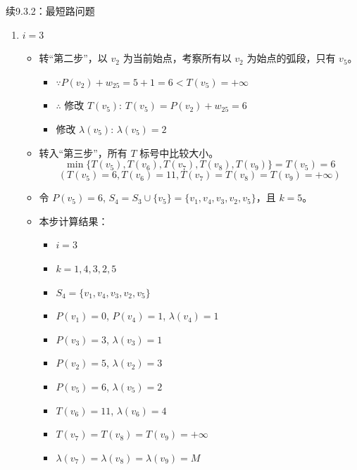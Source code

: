 \begin{exbox}{续9.3.2：最短路问题}{}
\begin{enumerate}[label=(\arabic*)]
			\item \( i = 3 \)
			\begin{itemize}
				\item 转“第二步”，以 \( v_2 \) 为当前始点，考察所有以 \( v_2 \) 为始点的弧段，只有 \( v_5 \)。
				\begin{itemize}
					\item \(\because P(v_2) + w_{25} = 5 + 1 = 6 < T(v_5) = +\infty \)
					\item \(\therefore\) 修改 \( T(v_5) \): \( T(v_5) = P(v_2) + w_{25} = 6 \)
					\item 修改 \( \lambda(v_5) \): \( \lambda(v_5) = 2 \)
				\end{itemize}
				\item 转入“第三步”，所有 \( T \) 标号中比较大小。
				\[
				\min\{T(v_5), T(v_6), T(v_7), T(v_8), T(v_9)\} = T(v_5) = 6
				\]
				\[
				(T(v_5) = 6, T(v_6) = 11, T(v_7) = T(v_8) = T(v_9) = +\infty)
				\]
				\item 令 \( P(v_5) = 6 \), \( S_4 = S_3 \cup \{v_5\} = \{v_1, v_4, v_3, v_2, v_5\} \)，且 \( k = 5 \)。
				\item 本步计算结果：
				\begin{itemize}
					\item \( i = 3 \)
					\item \( k = 1, 4, 3, 2, 5 \)
					\item \( S_4 = \{v_1, v_4, v_3, v_2, v_5\} \)
					\item \( P(v_1) = 0 \), \( P(v_4) = 1 \), \( \lambda(v_4) = 1 \)
					\item \( P(v_3) = 3 \), \( \lambda(v_3) = 1 \)
					\item \( P(v_2) = 5 \), \( \lambda(v_2) = 3 \)
					\item \( P(v_5) = 6 \), \( \lambda(v_5) = 2 \)
					\item \( T(v_6) = 11 \), \( \lambda(v_6) = 4 \)
					\item \( T(v_7) = T(v_8) = T(v_9) = +\infty \)
					\item \( \lambda(v_7) = \lambda(v_8) = \lambda(v_9) = M \)
				\end{itemize}
			\end{itemize}
		

\end{enumerate}
\end{exbox}
